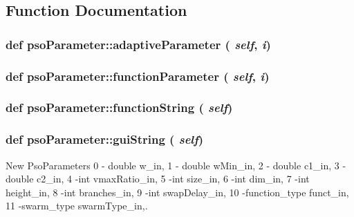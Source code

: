 \subsection{Function Documentation}
\hypertarget{namespacepsoParameter_8d728ee2ab1bff9769b404756151dcfd}{
\subsubsection{\setlength{\rightskip}{0pt plus 5cm}def psoParameter::adaptiveParameter ( {\em self}, \/   {\em i})}}
\label{namespacepsoParameter_8d728ee2ab1bff9769b404756151dcfd}


\hypertarget{namespacepsoParameter_5cb9e79fe67a1c2c627152daf9a22d2c}{
\subsubsection{\setlength{\rightskip}{0pt plus 5cm}def psoParameter::functionParameter ( {\em self}, \/   {\em i})}}
\label{namespacepsoParameter_5cb9e79fe67a1c2c627152daf9a22d2c}


\hypertarget{namespacepsoParameter_dbc3bc0037c2e5d516ea512cfd3ab2a0}{
\subsubsection{\setlength{\rightskip}{0pt plus 5cm}def psoParameter::functionString ( {\em self})}}
\label{namespacepsoParameter_dbc3bc0037c2e5d516ea512cfd3ab2a0}


\hypertarget{namespacepsoParameter_6c78a7e22e06e343ef022270b3bd4a6a}{
\subsubsection{\setlength{\rightskip}{0pt plus 5cm}def psoParameter::guiString ( {\em self})}}
\label{namespacepsoParameter_6c78a7e22e06e343ef022270b3bd4a6a}


New PsoParameters 0 - double w\_\-in, 1 - double wMin\_\-in, 2 - double c1\_\-in, 3 - double c2\_\-in, 4 -int vmaxRatio\_\-in, 5 -int size\_\-in, 6 -int dim\_\-in, 7 -int height\_\-in, 8 -int branches\_\-in, 9 -int swapDelay\_\-in, 10 -function\_\-type funct\_\-in, 11 -swarm\_\-type swarmType\_\-in,. 

